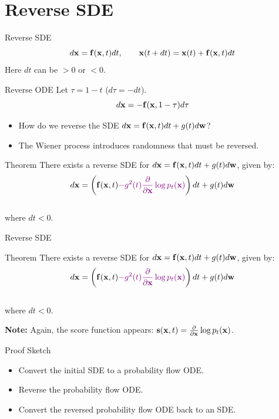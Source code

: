 \documentclass{beamer}
\begin{document}
\section{Reverse SDE}
\begin{frame}{Reverse SDE}
	\vspace{-0.3cm}
	\[
		d\mathbf{x} = \mathbf{f}(\mathbf{x}, t) dt,\qquad \mathbf{x}(t + dt) = \mathbf{x}(t) + \mathbf{f}(\mathbf{x}, t) dt
	\]
	Here $dt$ can be $>0$ or $<0$.
	\eqpause
	\begin{block}{Reverse ODE}
		Let $\tau = 1 - t$ ($d\tau = -dt$).
		\vspace{-0.3cm}
		\[
			d\mathbf{x} = - \mathbf{f}(\mathbf{x}, 1 - \tau) d\tau
		\]
	\end{block}
	\eqpause
	\vspace{-0.5cm}
	\begin{itemize}
		\item How do we reverse the SDE $d\mathbf{x} = \mathbf{f}(\mathbf{x}, t) dt + g(t) d \mathbf{w}$? 
		\item The Wiener process introduces randomness that must be reversed.
	\end{itemize}
	\eqpause
	\vspace{-0.3cm}
	\begin{block}{Theorem}
		There exists a reverse SDE for $d\mathbf{x} = \mathbf{f}(\mathbf{x}, t) dt + g(t) d \mathbf{w}$, given by:
		\vspace{-0.3cm}
		\[
			d\mathbf{x} = \left(\mathbf{f}(\mathbf{x}, t) {\color{violet}- g^2(t) \frac{\partial}{\partial \mathbf{x}}\log p_t(\mathbf{x})}\right) dt + g(t) d \mathbf{w}
		\]
		\vspace{-0.5cm}\\
		where $dt<0$.
	\end{block}
\end{frame}
\begin{frame}{Reverse SDE}
	\begin{block}{Theorem}
		There exists a reverse SDE for $d\mathbf{x} = \mathbf{f}(\mathbf{x}, t) dt + g(t) d \mathbf{w}$, given by:
		\vspace{-0.3cm}
		\[
			d\mathbf{x} = \left(\mathbf{f}(\mathbf{x}, t) {\color{violet}- g^2(t) \frac{\partial}{\partial \mathbf{x}}\log p_t(\mathbf{x})}\right) dt + g(t) d \mathbf{w}
		\]
		\vspace{-0.5cm}\\
		where $dt<0$.
	\end{block}
	\eqpause
	\textbf{Note:} Again, the score function appears: $\mathbf{s}(\mathbf{x}, t) = \frac{\partial}{\partial \mathbf{x}} \log p_t(\mathbf{x})$.
	\begin{block}{Proof Sketch}
		\begin{itemize}
			\item Convert the initial SDE to a probability flow ODE.
			\item Reverse the probability flow ODE.
			\item Convert the reversed probability flow ODE back to an SDE.
		\end{itemize}
	\end{block}
\end{frame}
\end{document}
